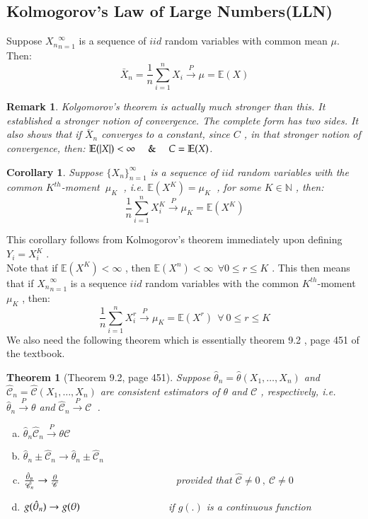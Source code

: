 \documentclass[14pt,twoside,a4paper,fleqn]{article}
\theoremstyle{plain}
\newtheorem{theorem}{Theorem}[section]
\newtheorem*{corollary*}{Corollary}
\newtheorem*{remark*}{Remark}
\begin{document}
\subsection{Kolmogorov's Law of Large Numbers(LLN)}
Suppose ${X_n}^{\infty}_{n=1}$ is a sequence of $iid$ random variables with common mean $\mu$. Then:
$$
	\bar{X}_n = \frac{1}{n} \sum_{i=1}^n X_i \xrightarrow{P} \mu = \mathbb{E}(X)
$$
\begin{remark*}
Kolgomorov's theorem is actually much stronger than this. It established a stronger notion of convergence. The complete form has two sides. It also shows that if $\bar{X}_n$ converges to a constant, since $C$ , in that stronger notion of convergence, then: \mbox{$\mathbb{E}(\vert X\vert)<\infty\ \ \ \And\ \ \ C=\mathbb{E}(X)$}.
\end{remark*}
\begin{corollary*}
Suppose $\big\{X_n \big\}^{\infty}_{n=1}$ is a sequence of $iid$ random variables with the common $K^{th}$-moment $\ \mu_K\ $ , i.e. $\mathbb{E}(X^K) = \mu_K\ $ , for some $K\in\mathbb{N}$ , then:
$$
	\frac{1}{n}\sum_{i=1}^nX_i^K \xrightarrow{P} \mu_K = \mathbb{E}(X^K)
$$
\end{corollary*}
This corollary follows from Kolmogorov's theorem immediately upon defining $Y_i = X_i^K$ .\\
Note that if $\mathbb{E}(X^K) < \infty$ , then $\mathbb{E}(X^n) < \infty \ \ \forall 0\leq r\leq K$ . This then means that if ${X_n}^{\infty}_{n=1}$ is a sequence $iid$ random variables with the common $K^{th}$-moment $\mu_K$ , then:
$$
	\frac{1}{n}\sum_{i=1}^n X_i^r \xrightarrow{P} \mu_K = \mathbb{E}(X^r) \ \ \forall\ 0\leq r\leq K
$$
We also need the following theorem which is essentially theorem 9.2 , page 451 of the textbook.
\begin{theorem}[Theorem 9.2, page 451]
	Suppose $\hat{\theta}_n = \hat{\theta}(X_1,\ldots,X_n)$ and \mbox{$\hat{\mathscr{C}}_n = 
\hat{\mathscr{C}}(X_1,\ldots,X_n)$} are consistent estimators of $\theta$ and $\mathscr{C}$ , respectively, i.e. $\hat{\theta}_n\xrightarrow{P}\theta$ and $\mathscr{\hat{C}}_n\xrightarrow{P}\mathscr{C}\ $ .
	\begin{enumerate}[a)]
	\item $\hat{\theta}_n\mathscr{\hat{C}}_n \xrightarrow{P} \theta\mathscr{C}$
	\item $\hat{\theta}_n \pm \mathscr{\hat{C}}_n \to \hat{\theta}_n \pm \hat{\mathscr{C}}_n$
	\item $\frac{\hat{\theta}_n}{\hat{\mathscr{C}}_n} \to \frac{\theta}{\mathscr{C}}\tab[4cm]$ provided that $\hat{\mathscr{C}}\neq 0\ , \ \mathscr{C}\neq 0$
	\item $g(\hat{\theta}_n)\to g(\theta)\tab[3cm]$ if $g(.)$ is a continuous function
	\end{enumerate}
\end{theorem}
\end{document}
